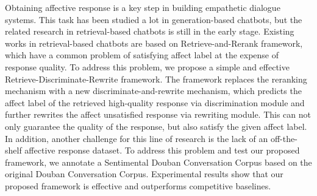 Obtaining affective response is a key step in building empathetic dialogue systems. This task has been studied a lot in generation-based chatbots, but the related research in retrieval-based chatbots is still in the early stage. Existing works in retrieval-based chatbots are based on Retrieve-and-Rerank framework, which have a common problem of satisfying affect label at the expense of response quality. To address this problem, we propose a simple and effective Retrieve-Discriminate-Rewrite framework. The framework replaces the reranking mechanism with a new discriminate-and-rewrite mechanism, which predicts the affect label of the retrieved high-quality response via discrimination module and further rewrites the affect unsatisfied response via rewriting module. This can not only guarantee the quality of the response, but also satisfy the given affect label. In addition, another challenge for this line of research is the lack of an off-the-shelf affective response dataset. To address this problem and test our proposed framework, we annotate a Sentimental Douban Conversation Corpus based on the original Douban Conversation Corpus. Experimental results show that our proposed framework is effective and outperforms competitive baselines.
